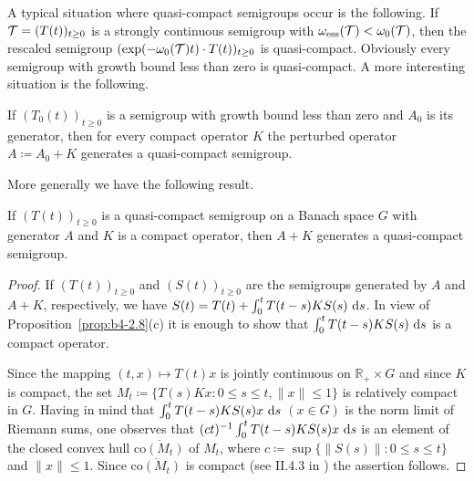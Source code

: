	A typical situation where quasi-compact semigroups occur is the following. 
    If $\mathcal{T} = (T(t))_{t \geq 0}$ is a strongly continuous semigroup with $\omega_{\text{ess}}(\mathcal{T}) < \omega_{0}(\mathcal{T})$, then the rescaled semigroup $(\text{exp}(-\omega_{0}(\mathcal{T})t)\cdot T(t))_{t \geq 0}$ is quasi-compact. 
    Obviously every semigroup with growth bound less than zero is quasi-compact. 
    A more interesting situation is the following.
	
	If $(T_{0}(t))_{t \geq 0}$ is a semigroup with growth bound less than zero and $A_{0}$ is its generator, then for every compact operator $K$ the perturbed operator $A \coloneqq A_{0} + K$ generates a quasi-compact semigroup.
	
	More generally we have the following result.
	\begin{proposition}\label{prop:b4-2.9}
		If $(T(t))_{t \geq 0}$ is a quasi-compact semigroup on a Banach space $G$ with generator $A$ and $K$ is a compact operator, then $A + K$ generates a quasi-compact semigroup.
	\end{proposition}
\begin{proof}
	If $(T(t))_{t \geq 0}$ and $(S(t))_{t \geq 0}$ are the semigroups generated by $A$ and $A + K$, respectively, we have $S(t) = T(t) + \int_0^t T(t-s)KS(s) \,\mathop{}\!\mathrm{d}{s}$.
	In view of Proposition~\ref{prop:b4-2.8}(c) it is enough to show that $\int_0^t T(t-s)KS(s) \,\mathop{}\!\mathrm{d}{s}$ is a compact operator.
	
	Since the mapping $(t,x) \mapsto T(t)x$ is jointly continuous on $\mathbb{R}_+ \times G$ and since $K$ is compact, the set $M_t \coloneq \{T(s)Kx \colon 0 \leq s \leq t, \|x\| \leq 1\}$ is relatively compact in $G$. Having in mind that $\int_0^t T(t-s)KS(s)x \,\mathop{}\!\mathrm{d}{s}$ $(x \in G)$ is the norm limit of Riemann sums, one observes that 
	$(ct)^{-1}\int_0^t T(t-s)KS(s)x \,\mathop{}\!\mathrm{d}{s}$ is an element of the closed convex hull
	 $\overline{\mathrm{co}(M_t)}$ of $M_t$, where $c \coloneq \sup \{\|S(s)\| \colon 0 \leq s \leq t\}$ and $\|x\| \leq 1$. Since $\overline{\mathrm{co}(M_t)}$ is compact (see II.4.3 in \citet{schaefer:1966}) the assertion follows.
\end{proof}

